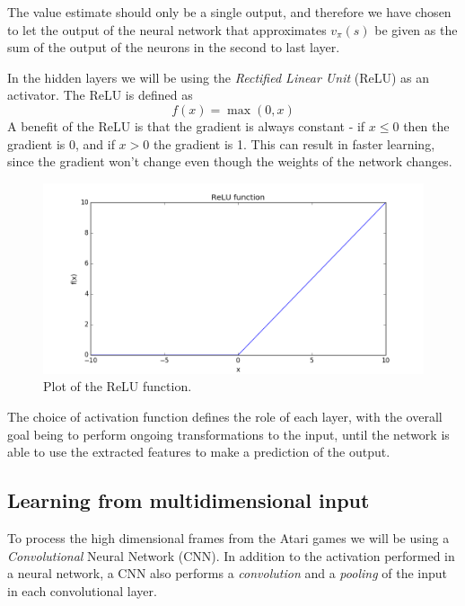 \documentclass[11pt]{article}
\begin{document}
The value estimate should only be a single output, and therefore we have chosen to
let the output of the neural network that approximates $v_\pi(s)$ be given
as the sum of the output of the neurons in the second to last layer.

In the hidden layers we will be using the \textit{Rectified
Linear Unit} (ReLU) as an activator.
The ReLU is defined as
\begin{equation}
    f(x) = \max(0,x)
\end{equation}
A benefit of the ReLU is that the gradient is always constant - 
if $x \leq 0$ then the gradient is 0, and if $x > 0$ the gradient is 1.
This can result in faster learning, since the gradient won't change even
though the weights of the network changes.
\begin{figure}[!h]
    \centering
    \includegraphics[width=15cm]{include/relu.png}
    \caption{Plot of the ReLU function.}
    \label{fig:relu}
\end{figure}

The choice of activation function defines the role of each layer,
with the overall goal being to perform ongoing transformations
to the input, until the network is able to use the extracted
features to make a prediction of the output.

\subsection{Learning from multidimensional input}

To process the high dimensional frames from the Atari games we will be using
a \textit{Convolutional} Neural Network (CNN).
In addition to the activation performed in a neural network, a CNN
also performs a \textit{convolution} and a \textit{pooling} of the input in each convolutional layer.
\end{document}
